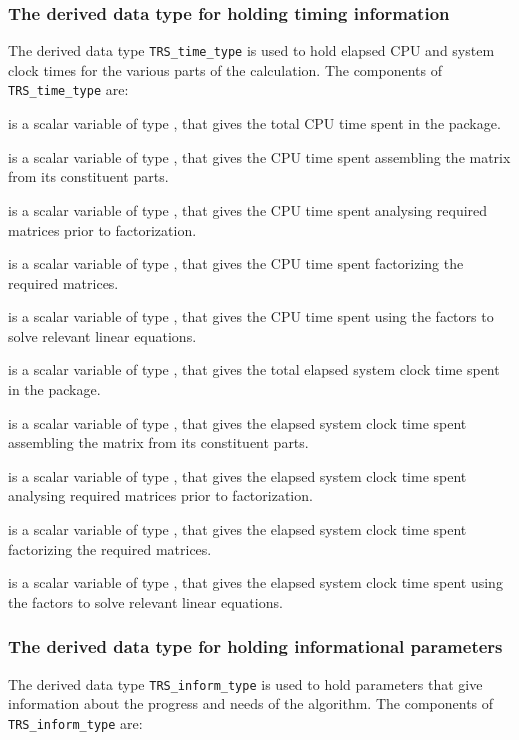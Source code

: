 \documentclass{galahad}
\newcommand{\packagename}{TRS}
\begin{document}

\subsubsection{The derived data type for holding timing
 information}\label{typetime}
The derived data type
{\tt \packagename\_time\_type}
is used to hold elapsed CPU and system clock times for the various parts of
the calculation. The components of
{\tt \packagename\_time\_type}
are:
\begin{description}
 is a scalar variable of type \realdp, that gives
 the total CPU time spent in the package.

 is a scalar variable of type \realdp, that gives
 the CPU time spent assembling the matrix  from its constituent parts.

 is a scalar variable of type \realdp, that gives
 the CPU time spent analysing required matrices prior to factorization.

 is a scalar variable of type \realdp, that gives
 the CPU time spent factorizing the required matrices.

 is a scalar variable of type \realdp, that gives
 the CPU time spent using the factors to solve relevant linear equations.

 is a scalar variable of type \realdp, that gives
 the total elapsed system clock time spent in the package.

 is a scalar variable of type \realdp, that gives
 the elapsed system clock time spent assembling the matrix  from
its constituent parts.

 is a scalar variable of type \realdp, that gives
 the elapsed system clock time spent analysing required matrices prior to
factorization.

 is a scalar variable of type \realdp, that gives
 the elapsed system clock time spent factorizing the required matrices.

 is a scalar variable of type \realdp, that gives
 the elapsed system clock time spent using the factors to solve relevant
linear equations.

\end{description}


\subsubsection{The derived data type for holding informational
 parameters}\label{typeinform}
The derived data type
{\tt \packagename\_inform\_type}
is used to hold parameters that give information about the progress and needs
of the algorithm. The components of
{\tt \packagename\_inform\_type}
are:
\end{document}
